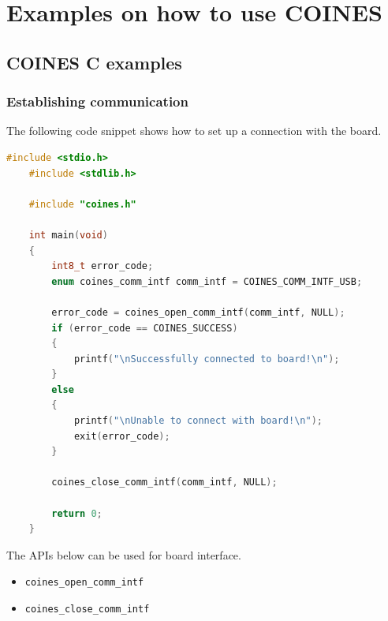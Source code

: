 \documentclass[11pt,headings=small]{scrartcl}
\begin{document}
\section{Examples on how to use COINES}
\subsection{COINES C examples}
\subsubsection{Establishing communication}
The following code snippet shows how to set up a connection with the board.
\begin{lstlisting}[language=c]
	#include <stdio.h>
	#include <stdlib.h>
	
	#include "coines.h"
	
	int main(void)
	{
		int8_t error_code;
		enum coines_comm_intf comm_intf = COINES_COMM_INTF_USB;

		error_code = coines_open_comm_intf(comm_intf, NULL);
		if (error_code == COINES_SUCCESS)
		{
			printf("\nSuccessfully connected to board!\n");
		}
		else
		{
			printf("\nUnable to connect with board!\n");
			exit(error_code);
		}
	
		coines_close_comm_intf(comm_intf, NULL);
	
		return 0;
	}

\end{lstlisting}
The APIs below can be used for board interface.
\begin{itemize}
	\item \texttt{coines\_open\_comm\_intf}
	\item \texttt{coines\_close\_comm\_intf}
\end{itemize}
\end{document}
